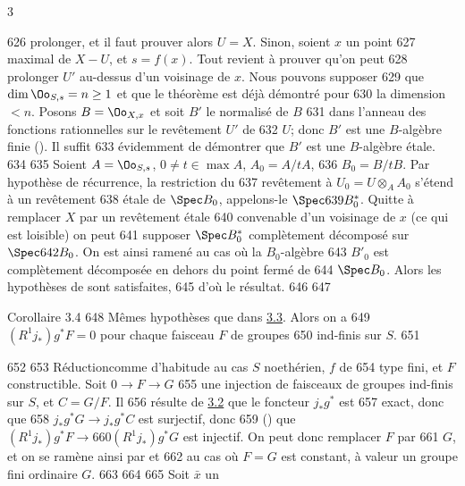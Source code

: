 3	\documentclass[10pt]{../fichiers-configuration-latex/smfart}
\begin{document}
   626	prolonger, et il faut prouver alors $U=X$. Sinon, soient $x$ un point
   627	maximal de $X-U$, et $s=f(x)$. Tout revient à prouver qu'on peut
   628	prolonger $U'$ au-dessus d'un voisinage de $x$. Nous pouvons supposer
   629	que $\dim \Oo_{S,s}=n\geq 1$ et que le théorème est déjà démontré pour
   630	la dimension $<n$. Posons $B=\Oo_{X,x}$ et soit $B'$ le normalisé de $B$
   631	dans l'anneau des fonctions rationnelles sur le revêtement $U'$ de
   632	$U$; donc $B'$ est une $B$-algèbre finie (\loccit). Il suffit
   633	évidemment de démontrer que $B'$ est une $B$-algèbre étale.
   634	
   635	Soient $A=\Oo_{S,s}$, $0\neq t\in \max A$, $A_{0}=A/tA$,
   636	$B_{0}=B/tB$. Par hypothèse de récurrence, la restriction du
   637	revêtement à $U_{0}=U\otimes_A A_{0}$ s'étend à un revêtement
   638	étale de $\Spec B_{0}$, appelons-le $\Spec
   639	B^{\ast}_{0}$. Quitte à remplacer $X$ par un revêtement étale
   640	convenable d'un voisinage de $x$ (ce qui est loisible) on peut
   641	supposer $\Spec B^{\ast}_{0}$ complètement décomposé sur $\Spec
   642	B_{0}$. On est ainsi ramené au cas où la $B_{0}$-algèbre
   643	$B'_{0}$ est complètement décomposée en dehors du point fermé de
   644	$\Spec B_{0}$. Alors les hypothèses de  sont satisfaites,
   645	d'où le résultat.
   646	
   647	\begin{enonce*}{Corollaire 3.4}
   648	Mêmes hypothèses que dans \hyperref[XVI.thm3.3]{3.3}. Alors on a
   649	$(R^{1}j_{\ast})g^{\ast}F=0$ pour chaque faisceau $F$ de groupes
   650	ind-finis sur $S$.
   651	\end{enonce*}
   652	
   653	Réduction\pageoriginale comme d'habitude au cas $S$ noethérien, $f$ de
   654	type fini, et $F$ constructible. Soit $0\rightarrow F\rightarrow G$
   655	une injection de faisceaux de groupes ind-finis sur $S$, et $C=G/F$. Il
   656	résulte de \hyperref[XVI.prop3.2]{3.2} que le foncteur $j_{\ast}g^{\ast}$ est
   657	exact, donc que 
   658	$j_{\ast}g^{\ast}G\rightarrow j_{\ast}g^{\ast}C$ est surjectif, donc
   659	() que $(R^{1}j_{\ast})g^{\ast}F\rightarrow
   660	(R^{1}j_{\ast})g^{\ast}G$ est injectif. On peut donc remplacer $F$ par
   661	$G$, et on se ramène ainsi par  et 
   662	au cas où $F=G$ est constant, à valeur un groupe fini ordinaire $G$.
   663	%
   664	%
   665	Soit $\bar{x}$ un
\end{document}
